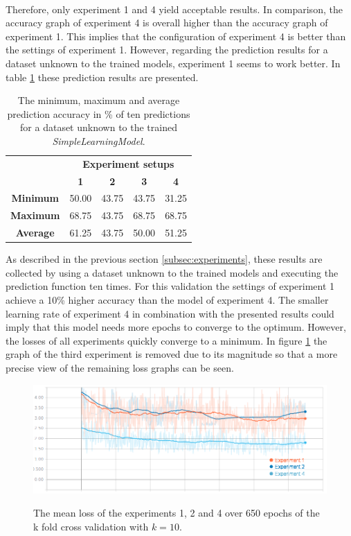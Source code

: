 \\ Therefore, only experiment 1 and 4 yield acceptable results. In comparison, the accuracy graph of experiment 4 is overall higher than the accuracy graph of experiment 1. This implies that the configuration of experiment 4 is better than the settings of experiment 1. However, regarding the prediction results for a dataset unknown to the trained models, experiment 1 seems to work better. In table \ref{tbl:slmpredictresults} these prediction results are presented. 
\begin{table}[!ht]
	\begin{center}
		\begin{tabular}{c|c|c|c|c|}
			\multirow{2}{1cm}{} & \multicolumn{4}{c|}{\textbf{Experiment setups}} \\
			& \textbf{1} & \textbf{2} & \textbf{3} & \textbf{4}\\
			\hline
			\textbf{Minimum} & 50.00 & 43.75 & 43.75 & 31.25 \\
			\hline
			\textbf{Maximum} & 68.75 & 43.75 & 68.75 & 68.75 \\
			\hline
			\textbf{Average} & 61.25 & 43.75 & 50.00 & 51.25 \\
		\end{tabular}
	\end{center}
	\caption{The minimum, maximum and average prediction accuracy in \% of ten predictions for a dataset unknown to the trained \textit{SimpleLearningModel}. }
	\label{tbl:slmpredictresults}
\end{table}
As described in the previous section \ref{subsec:experiments}, these results are collected by using a dataset unknown to the trained models and executing the prediction function ten times. For this validation the settings of experiment 1 achieve a 10\% higher accuracy than the model of experiment 4. The smaller learning rate of experiment 4 in combination with the presented results could imply that this model needs more epochs to converge to the optimum. However, the losses of all experiments quickly converge to a minimum. In figure \ref{fig:loss650epochs2} the graph of the third experiment is removed due to its magnitude so that a more precise view of the remaining loss graphs can be seen. 
\begin{figure}[!ht]
	\caption{The mean loss of the experiments 1, 2 and 4 over 650 epochs of the k fold cross validation with $k=10$. }
	\includegraphics[width=0.95\linewidth]{images/evaluation/slm-k-losses-2.png}
	\label{fig:loss650epochs2}
\end{figure}


